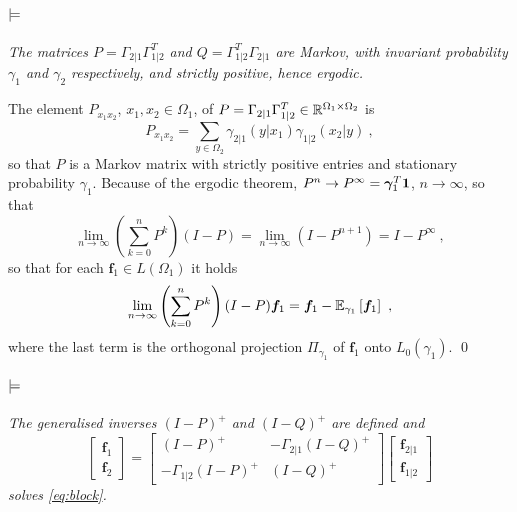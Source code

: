 \documentclass[runningheads]{llncs}
\begin{document}
\paragraph{$\bf\models$} \emph{The matrices $P = \Gamma_{2|1}\Gamma_{1|2}^T$ and $Q = \Gamma_{1|2}^T\Gamma_{2|1}$ are Markov, with invariant probability $\gamma_1$ and $\gamma_2$ respectively, and strictly positive, hence ergodic.}

The element $P_{x_1x_2}$, $x_1,x_2 \in \Omega_1$, of $P = \Gamma_{2|1}\Gamma_{1|2}^T \in \mathbb R^{\Omega_1 \times \Omega_2}$ is
%
\begin{equation*}
  P_{x_1x_2} = \sum_{y \in \Omega_2} \gamma_{2|1}(y|x_1) \gamma_{1|2}(x_2|y) \ ,
\end{equation*}
%
so that $P$ is a Markov matrix with strictly positive entries and stationary probability $\gamma_1$. Because of the ergodic theorem, $P^n \to P^\infty = {\bm \gamma}_1^T \bm 1$, $n \to \infty$, so that 
%
\begin{equation*}
\lim_{n\to\infty} \left(\sum_{k=0}^n P^k\right)(I-P) = \lim_{n\to\infty} \left(I - P^{n+1}\right) = I - P^\infty \ , 
\end{equation*}
%
so that for each $\bm f_1 \in L(\Omega_1)$ it holds
%
\begin{equation*}
  \lim_{n\to\infty} \left(\sum_{k=0}^n P^k\right)(I-P) \bm f_1 = \bm f_1 - {\operatorname{\mathbb E}}_{\gamma_1}\left[\bm f_1\right] \ ,
\end{equation*}
%
where the last term is the orthogonal projection $\Pi_{\gamma_1}$ of $\bm f_1$ onto $L_0(\gamma_1)$. \qed

\paragraph{$\bf\models$} \emph{The generalised inverses $(I-P)^+$ and $(I-Q)^+$ are defined and 
%
  \begin{equation*}
  \begin{bmatrix}
    \bm f_1 \\ \bm f_2
  \end{bmatrix}
=
    \begin{bmatrix}
      (I - P)^+ & - \Gamma_{2|1}(I - Q)^+ \\
- \Gamma_{1|2}(I-P)^+ & (I-Q)^+
    \end{bmatrix}
    \begin{bmatrix}
      \bm f_{2|1} \\ \bm f_{1|2}
    \end{bmatrix}
  \end{equation*}
%
solves \cref{eq:block}.}
\end{document}
